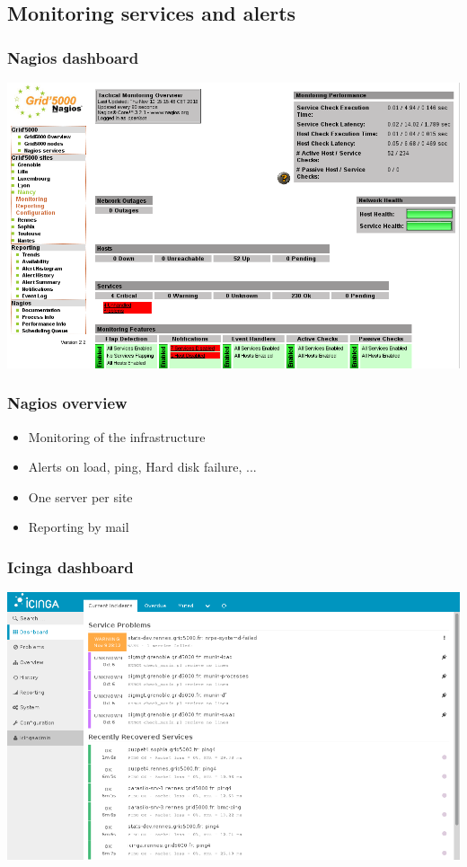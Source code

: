 \documentclass[11pt,compress,final]{beamer}
\begin{document}
\subsection{Monitoring services and alerts}
\begin{frame}
\frametitle{Nagios dashboard}
\begin{center}
\includegraphics[scale=0.29]{figures/nagios}
\end{center}
\end{frame}

\begin{frame}
\frametitle{Nagios overview}
\begin{itemize}
\item Monitoring of the infrastructure
\item Alerts on load, ping, Hard disk failure, ...
\item One server per site
\item Reporting by mail 
\end{itemize}
\end{frame}

\begin{frame}
\frametitle{Icinga dashboard}
\begin{center}
\includegraphics[scale=0.30]{figures/icinga}
\end{center}
\end{frame}
\end{document}
